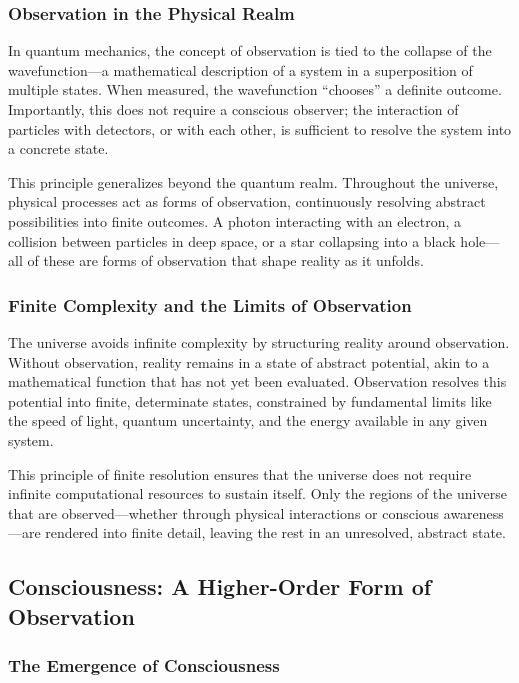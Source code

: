 \documentclass[12pt]{article}
\begin{document}
\subsubsection{Observation in the Physical Realm}

In quantum mechanics, the concept of observation is tied to the collapse of the wavefunction—a mathematical description of a system in a superposition of multiple states. When measured, the wavefunction ``chooses'' a definite outcome. Importantly, this does not require a conscious observer; the interaction of particles with detectors, or with each other, is sufficient to resolve the system into a concrete state.

This principle generalizes beyond the quantum realm. Throughout the universe, physical processes act as forms of observation, continuously resolving abstract possibilities into finite outcomes. A photon interacting with an electron, a collision between particles in deep space, or a star collapsing into a black hole—all of these are forms of observation that shape reality as it unfolds.

\subsubsection{Finite Complexity and the Limits of Observation}

The universe avoids infinite complexity by structuring reality around observation. Without observation, reality remains in a state of abstract potential, akin to a mathematical function that has not yet been evaluated. Observation resolves this potential into finite, determinate states, constrained by fundamental limits like the speed of light, quantum uncertainty, and the energy available in any given system.

This principle of finite resolution ensures that the universe does not require infinite computational resources to sustain itself. Only the regions of the universe that are observed—whether through physical interactions or conscious awareness—are rendered into finite detail, leaving the rest in an unresolved, abstract state.

\subsection{Consciousness: A Higher-Order Form of Observation}

\subsubsection{The Emergence of Consciousness}
\end{document}
